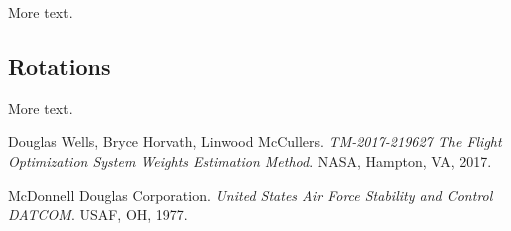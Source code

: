 \documentclass[11pt]{article} %
\begin{document}
More text.

\subsection{Rotations}

More text.

\pagebreak

\begin{thebibliography}{9}
Douglas Wells, Bryce Horvath, Linwood McCullers. 
\textit{TM-2017-219627 The Flight Optimization System Weights Estimation Method}. 
NASA, Hampton, VA, 2017.

McDonnell Douglas Corporation. 
\textit{United States Air Force Stability and Control DATCOM}. 
USAF, OH, 1977.
\end{thebibliography}
\end{document}
